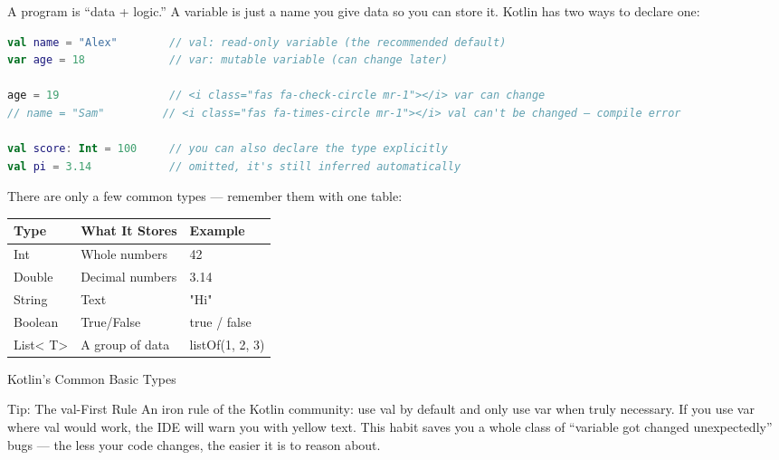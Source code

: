 


A program is “data + logic.” A variable is just a name you give data so you can store it. Kotlin has two ways to declare one:

\begin{lstlisting}[language=Kotlin]
val name = "Alex"        // val: read-only variable (the recommended default)
var age = 18             // var: mutable variable (can change later)

age = 19                 // <i class="fas fa-check-circle mr-1"></i> var can change
// name = "Sam"         // <i class="fas fa-times-circle mr-1"></i> val can't be changed — compile error

val score: Int = 100     // you can also declare the type explicitly
val pi = 3.14            // omitted, it's still inferred automatically
\end{lstlisting}

There are only a few common types — remember them with one table:

\begin{center}
\begin{tabularx}{\linewidth}{|X|X|X|}
\hline
\textbf{Type} & \textbf{What It Stores} & \textbf{Example} \tabularnewline
\hline
Int & Whole numbers & 42 \tabularnewline
Double & Decimal numbers & 3.14 \tabularnewline
String & Text & "Hi" \tabularnewline
Boolean & True/False & true / false \tabularnewline
List< T> & A group of data & listOf(1, 2, 3) \tabularnewline
\hline
\end{tabularx}
\end{center}

\begin{center}\small\color{gray}Kotlin's Common Basic Types\end{center}

\begin{tcbinfo}{Tip: The val-First Rule}
An iron rule of the Kotlin community: use val by default and only use var when truly necessary. If you use var where val would work, the IDE will warn you with yellow text. This habit saves you a whole class of “variable got changed unexpectedly” bugs — the less your code changes, the easier it is to reason about.

\end{tcbinfo}

